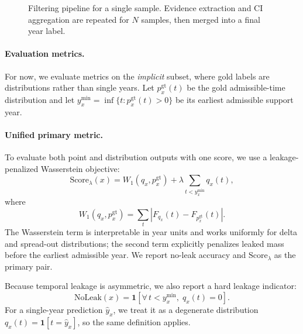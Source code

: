 \begin{figure}[t]
    \caption{Filtering pipeline for a single sample.
    Evidence extraction and CI aggregation are repeated for $N$ samples, then merged into a final year label.}
    \label{fig:filtering-flow}
\end{figure}

\paragraph{Evaluation metrics.}
For now, we evaluate metrics on the \emph{implicit} subset, where gold labels are distributions rather than single years. Let $p_x^{\mathrm{gt}}(t)$ be the gold admissible-time distribution and let $y_x^{\min} = \inf\{t : p_x^{\mathrm{gt}}(t) > 0\}$ be its earliest admissible support year.

\paragraph{Unified primary metric.}
To evaluate both point and distribution outputs with one score, we use a leakage-penalized Wasserstein objective:
\[
\text{Score}_{\lambda}(x)
= W_1\!\left(q_x,p_x^{\mathrm{gt}}\right)
+ \lambda \sum_{t<y_x^{\min}} q_x(t),
\]
where
\[
W_1\!\left(q_x,p_x^{\mathrm{gt}}\right)=\sum_t \left|F_{q_x}(t)-F_{p_x^{\mathrm{gt}}}(t)\right|.
\]
The Wasserstein term is interpretable in year units and works uniformly for delta and spread-out distributions; the second term explicitly penalizes leaked mass before the earliest admissible year. We report no-leak accuracy and $\text{Score}_{\lambda}$ as the primary pair.

Because temporal leakage is asymmetric, we also report a hard leakage indicator:
\[
\text{NoLeak}(x)
= \mathbf{1}\!\left[\forall\, t < y_x^{\min},\; q_x(t) = 0\right].
\]
For a single-year prediction $\hat{y}_x$, we treat it as a degenerate distribution $q_x(t)=\mathbf{1}[t=\hat{y}_x]$, so the same definition applies.


